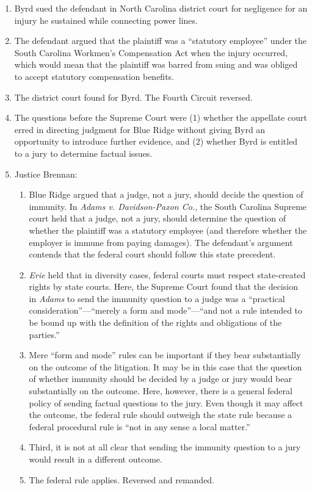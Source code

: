 \begin{enumerate}
    \item Byrd sued the defendant in North Carolina district court for 
    negligence for an injury he sustained while connecting power lines.
    \item The defendant argued that the plaintiff was a ``statutory employee'' 
    under the South Carolina Workmen's Compensation Act when the injury 
    occurred, which would mean that the plaintiff was barred from suing and 
    was obliged to accept statutory compensation benefits.
    \item The district court found for Byrd. The Fourth Circuit reversed.
    \item The questions before the Supreme Court were (1) whether the 
    appellate court erred in directing judgment for Blue Ridge without giving 
    Byrd an opportunity to introduce further evidence, and (2) whether Byrd is 
    entitled to a jury to determine factual issues.
    \item Justice Brennan:
    \begin{enumerate}
        \item Blue Ridge argued that a judge, not a jury, should decide the 
        question of immunity. In \emph{Adams v. Davidson-Paxon Co.}, the South 
        Carolina Supreme court held that a judge, not a jury, should determine 
        the question of whether the plaintiff was a statutory employee (and 
        therefore whether the employer is immune from paying damages). The 
        defendant's argument contends that the federal court should follow 
        this state precedent.
        \item \emph{Erie} held that in diversity cases, federal courts 
        must respect state-created rights by state courts. Here, the Supreme 
        Court found that the decision in \emph{Adams} to send the immunity 
        question to a judge was a ``practical consideration''---``merely a 
        form and mode''---``and not a rule intended to be bound up with the 
        definition of the rights and obligations of the parties.''
        \item Mere ``form and mode'' rules can be important if they 
        bear substantially on the outcome of the litigation. It may be in this 
        case that the question of whether immunity should be decided by a 
        judge or jury would bear substantially on the outcome. Here, however, 
        there is a general federal policy of sending factual questions to the 
        jury. Even though it may affect the outcome, the federal rule should 
        outweigh the state rule because a federal procedural rule is ``not in 
        any sense a local matter.''
        \item Third, it is not at all clear that sending the immunity question 
        to a jury would result in a different outcome.
        \item The federal rule applies. Reversed and remanded.
    \end{enumerate}
\end{enumerate}

